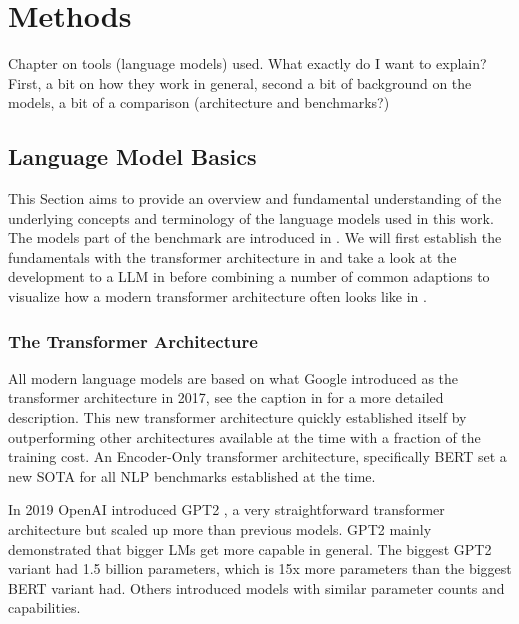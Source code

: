 \chapter{Methods}\label{chap:methods}
{\color{blue}
Chapter on tools (language models) used. What exactly do I want to explain?
First, a bit on how they work in general, second a bit of background on the models, a bit of a comparison (architecture and benchmarks?)
}


\section{Language Model Basics}\label{sec:lm}
This Section aims to provide an overview and fundamental understanding of the underlying concepts and terminology of the language models used in this work.
The models part of the benchmark are introduced in .
We will first establish the fundamentals with the transformer architecture in  and take a look at the development to a \acrlong{LLM} in  before combining a number of common adaptions to visualize how a modern transformer architecture often looks like in .


\subsection{The Transformer Architecture}\label{sub:transformer}


All modern language models are based on what Google introduced as the transformer architecture \cite{vaswani_attention_2017} in 2017, see the caption in  for a more detailed description. 
This new transformer architecture quickly established itself by outperforming other architectures available at the time with a fraction of the training cost.
An Encoder-Only transformer architecture, specifically \gls{BERT} \cite{devlin_bert_2018} set a new \gls{SOTA} for all \gls{NLP} benchmarks established at the time.

In 2019 \gls{OpenAI} introduced \gls{GPT2} \cite{radford_language_2019}, a very straightforward transformer architecture but scaled up more than previous models. \gls{GPT2} mainly demonstrated that bigger \glspl{LM} get more capable in general.
The biggest \gls{GPT2} variant had 1.5 billion parameters, which is 15x more parameters than the biggest \gls{BERT} variant had.
Others introduced models with similar parameter counts and capabilities.

